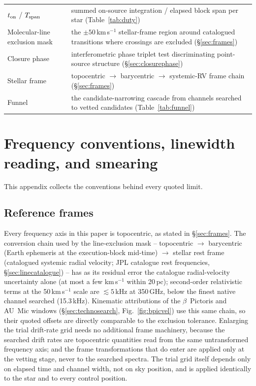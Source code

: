 \documentclass{openjournal}
\begin{document}
\begin{table}
\begin{tabularx}{\textwidth}{@{}lX@{}}
$t_{\rm on}$ / $T_{\rm span}$ & summed on-source integration / elapsed block span per star (Table~\ref{tab:duty}) \\
Molecular-line exclusion mask & the $\pm50$\,km\,s$^{-1}$ stellar-frame region around catalogued transitions where crossings are excluded (\S\ref{sec:frames}) \\
Closure phase & interferometric phase triplet test discriminating point-source structure (\S\ref{sec:closurephase}) \\
Stellar frame & topocentric $\rightarrow$ barycentric $\rightarrow$ systemic-RV frame chain (\S\ref{sec:frames}) \\
Funnel & the candidate-narrowing cascade from channels searched to vetted candidates (Table~\ref{tab:funnel}) \\
\hline
\end{tabularx}
\end{table}

\section{Frequency conventions, linewidth reading, and smearing}
\label{app:conventions}

This appendix collects the conventions behind every quoted limit.

\subsection*{Reference frames}

Every frequency axis in this paper is topocentric, as stated in
\S\ref{sec:frames}. The conversion chain used by the line-exclusion
mask -- topocentric $\rightarrow$ barycentric (Earth ephemeris at the
execution-block mid-time) $\rightarrow$ stellar rest frame (catalogued
systemic radial velocity; JPL catalogue rest frequencies,
\S\ref{sec:linecatalogue}) -- has as its residual error the catalogue
radial-velocity uncertainty alone (at most a few km\,s$^{-1}$ within
20\,pc); second-order relativistic terms at the 50\,km\,s$^{-1}$ scale
are $\lesssim5$\,kHz at 350\,GHz, below the finest native channel
searched (15.3\,kHz). Kinematic attributions of the $\beta$~Pictoris
and AU~Mic windows (\S\ref{sec:technosearch}, Fig.~\ref{fig:bpicvel})
use this same chain, so their quoted offsets are directly comparable
to the exclusion tolerance. Enlarging the trial drift-rate grid needs
no additional frame machinery, because the searched drift rates are
topocentric quantities read from the same untransformed frequency
axis; and the frame transformations that do enter are applied only at
the vetting stage, never to the searched spectra. The trial grid
itself depends only on elapsed time and channel width, not on sky
position, and is applied identically to the star and to every control
position.
\end{document}
